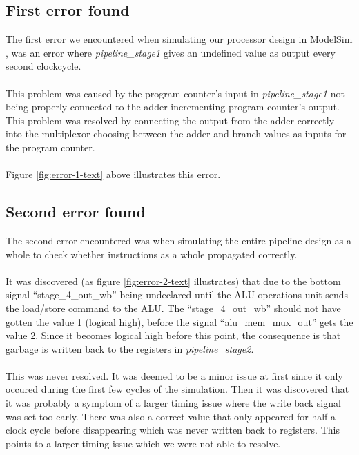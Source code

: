 \subsection{First error found}
The first error we encountered when simulating our processor design in ModelSim
\cite{modelsim}, was an error where \emph{pipeline\_stage1} gives an undefined
value as output every second clockcycle.
\paragraph*{}

This problem was caused by the program counter's input in
\emph{pipeline\_stage1} not being properly connected to the adder incrementing
program counter's output. This problem was resolved by connecting the output
from the adder correctly into the multiplexor choosing between the adder and
branch values as inputs for the program counter.
\paragraph*{}
Figure \ref{fig:error-1-text} above illustrates this error.

\subsection{Second error found}
The second error encountered was when simulating the entire pipeline design as
a whole to check whether instructions as a whole propagated correctly.
\paragraph*{}
It was discovered (as figure \ref{fig:error-2-text} illustrates) that due to the
bottom signal ``stage\_4\_out\_wb'' being undeclared until the ALU operations unit
sends the load/store command to the ALU. The ``stage\_4\_out\_wb'' should not
have gotten the value 1 (logical high), before the signal ``alu\_mem\_mux\_out''
gets the value 2. Since it becomes logical high before this point, the
consequence is that garbage is written back to the registers in
\emph{pipeline\_stage2}.

\paragraph*{}
This was never resolved. It was deemed to be a minor issue at first since it only occured during the first few cycles of the simulation. Then it was discovered that it was probably a symptom of a larger timing issue where the write back signal was set too early. There was also a correct value that only appeared for half a clock cycle before disappearing which was never written back to registers. This points to a larger timing issue which we were not able to resolve.

